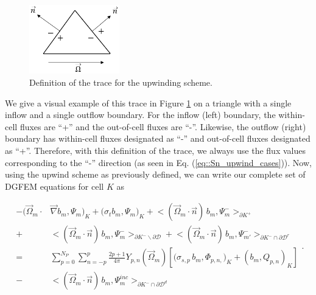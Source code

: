 \begin{figure}
\centering
\includegraphics[width=0.35\textwidth]{figures/sec_Sn/upwind_triangle.png}
\caption{Definition of the trace for the upwinding scheme.}
\label{fig::Sn_Spatial_upwind_triangle}
\end{figure}

\noindent We give a visual example of this trace in Figure \ref{fig::Sn_Spatial_upwind_triangle} on a triangle with a single inflow and a single outflow boundary. For the inflow (left) boundary, the within-cell fluxes are ``+'' and the out-of-cell fluxes are ``-''. Likewise, the outflow (right) boundary has within-cell fluxes designated as ``-'' and out-of-cell fluxes designated as ``+''. Therefore, with this definition of the trace, we always use the flux values corresponding to the ``-'' direction (as seen in Eq. (\ref{eq::Sn_upwind_cases})). Now, using the upwind scheme as previously defined, we can write our complete set of DGFEM equations for cell $K$ as

\begin{equation}
\label{eq::Sn_DGFEM_trans_eq_cellK_complete}
\begin{aligned}
-  \Big( \vec{\Omega}_m \cdot  & \vec{\nabla} b_m, \Psi_{m} \Big)_{K}   + \Big(  \sigma_{t} b_m ,   \Psi_{m} \Big)_{K} +  \Big< ( \vec{\Omega}_m \cdot \vec{n} ) \, b_m, {\Psi}_m^{-}  \Big>_{\partial K^+}  \\
  + & \Big< ( \vec{\Omega}_m \cdot \vec{n} ) \, b_m, {\Psi}_m^{-}  \Big>_{\partial K^- \backslash \partial \mathcal{D}}  + \Big< ( \vec{\Omega}_m \cdot \vec{n} ) \, b_m, {\Psi}^{-}_{m'}  \Big>_{\partial K^- \cap \partial \mathcal{D}^r}  \\
= & \sum_{p=0}^{N_P} \sum_{n=-p}^{p} \frac{2p + 1}{4 \pi}  Y_{p,n} (  \vec{\Omega}_m ) \left[ \Big( \sigma_{s,p} \, b_m,  \Phi_{p,n,} \Big)_{K}  + \left(  b_m ,   Q_{p,n} \right)_{K} \right] \\
- & \Big< ( \vec{\Omega}_m \cdot \vec{n} ) \, b_m, {\Psi}_m^{inc}  \Big>_{\partial K^- \cap \partial \mathcal{D}^d}
\end{aligned} .
\end{equation} 

